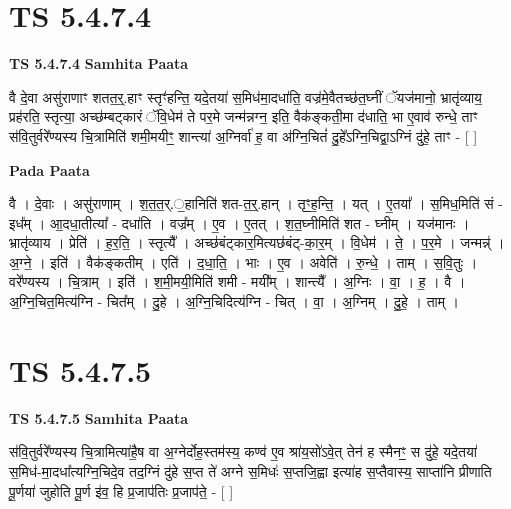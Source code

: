 \documentclass[17pt]{extarticle}
\begin{document}

\section{ TS 5.4.7.4 }

\textbf{TS 5.4.7.4 } \newline
\textbf{Samhita Paata} \newline

वै दे॒वा असु॑राणाꣳ शतत॒र्॒.हाꣳ स्तृꣳ॑हन्ति॒ यदे॒तया॑ स॒मिध॑मा॒दधा॑ति॒ वज्र॑मे॒वैतच्छ॑त॒घ्नीं ॅयज॑मानो॒ भ्रातृ॑व्याय॒ प्रह॑रति॒ स्तृत्या॒ अच्छ॑म्बट्कारं ॅवि॒धेम॑ ते पर॒मे जन्म॑न्नग्न॒ इति॒ वैक॑ङ्कती॒मा द॑धाति॒ भा ए॒वाव॑ रुन्धे॒ ताꣳ स॑वि॒तुर्वरे᳚ण्यस्य चि॒त्रामिति॑ शमी॒मयीꣳ॒॒ शान्त्या॑ अ॒ग्निर्वा॑ ह॒ वा अ॑ग्नि॒चितं॑ दु॒हे᳚ऽग्नि॒चिद्वा॒ऽग्निं दु॑हे॒ ताꣳ - [  ] \newline

\textbf{Pada Paata} \newline

वै । दे॒वाः । असु॑राणाम् । श॒त॒त॒र्.॒हानिति॑ शत-त॒र्॒.हान् । तृꣳ॒॒ह॒न्ति॒ । यत् । ए॒तया᳚ । स॒मिध॒मिति॑ सं - इध᳚म् । आ॒दधा॒तीत्या᳚ - दधा॑ति । वज्र᳚म् । ए॒व । ए॒तत् । श॒त॒घ्नीमिति॑ शत - घ्नीम् । यज॑मानः । भ्रातृ॑व्याय । प्रेति॑ । ह॒र॒ति॒ । स्तृत्यै᳚ । अच्छ॑बंट्कार॒मित्यछ॑बंट्-का॒र॒म् । वि॒धेम॑ । ते॒ । प॒र॒मे । जन्मन्न्॑ । अ॒ग्ने॒ । इति॑ । वैक॑ङ्कतीम् । एति॑ । द॒धा॒ति॒ । भाः । ए॒व । अवेति॑ । रु॒न्धे॒ । ताम् । स॒वि॒तुः । वरे᳚ण्यस्य । चि॒त्राम् । इति॑ । श॒मी॒मयी॒मिति॑ शमी - मयी᳚म् । शान्त्यै᳚ । अ॒ग्निः । वा॒ । ह॒ । वै । अ॒ग्नि॒चित॒मित्य॑ग्नि - चित᳚म् । दु॒हे । अ॒ग्नि॒चिदित्य॑ग्नि - चित् । वा॒ । अ॒ग्निम् । दु॒हे॒ । ताम् ।  \newline





\section{ TS 5.4.7.5 }

\textbf{TS 5.4.7.5 } \newline
\textbf{Samhita Paata} \newline

स॑वि॒तुर्वरे᳚ण्यस्य चि॒त्रामित्या॑है॒ष वा अ॒ग्नेर्दोह॒स्तम॑स्य॒ कण्व॑ ए॒व श्रा॑य॒सो॑ऽवे॒त् तेन॑ ह स्मैनꣳ॒॒ स दु॑हे॒ यदे॒तया॑ स॒मिध॑-मा॒दधा᳚त्यग्नि॒चिदे॒व तद॒ग्निं दु॑हे स॒प्त ते॑ अग्ने स॒मिधः॑ स॒प्तजि॒ह्वा इत्या॑ह स॒प्तैवास्य॒ साप्ता॑नि प्रीणाति पू॒र्णया॑ जुहोति पू॒र्ण इ॑व॒ हि प्र॒जाप॑तिः प्र॒जाप॑ते॒ - [  ] \newline
\end{document}
